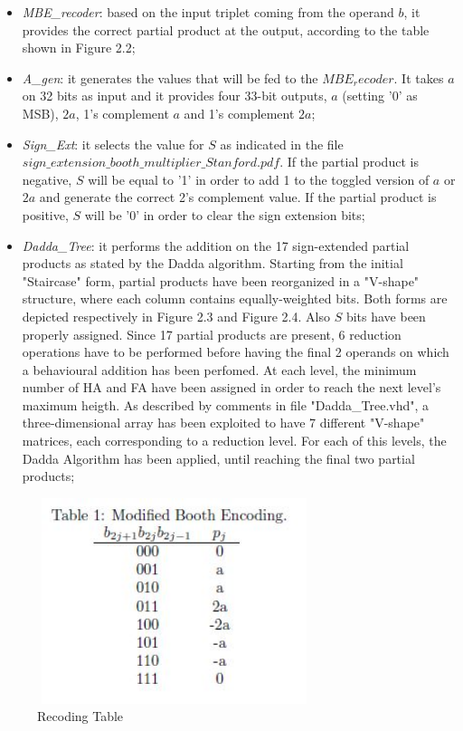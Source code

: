 \begin{itemize}
 
\item \emph{MBE\_recoder}: based on the input triplet coming from the operand $b$, it provides the correct partial product 
at the output, according to the table shown in Figure 2.2;

\item \emph{A\_gen}: it generates the values that will be fed to the $MBE_recoder$. It takes
$a$ on 32 bits as input and it provides four 33-bit outputs, $a$ (setting '0' as MSB), $2a$,
1's complement $a$ and 1's complement $2a$;

\item \emph{Sign\_Ext}: it selects the value for $S$ as indicated in the file
$sign\_extension\_booth\_multiplier\_Stanford.pdf$. If the partial product is negative, $S$ will be 
equal to '1' in order to add 1 to the toggled version of $a$ or $2a$ and generate the correct
2's complement value. If the partial product is positive, $S$ will be '0' in order to clear
the sign extension bits;

\item \emph{Dadda\_Tree}: it performs the addition on the 17 sign-extended partial products as
stated by the Dadda algorithm. Starting from the initial "Staircase" form, partial products have been reorganized in a "V-shape" structure, where each column contains equally-weighted bits. Both forms are depicted respectively in Figure 2.3 and Figure 2.4. Also $S$
bits have been properly assigned. Since 17 partial products are present, 6 reduction operations have to be performed before having the final 2 operands on which a behavioural
addition has been perfomed. At each level, the minimum number of HA and FA have been assigned
in order to reach the next level's maximum heigth. As described by comments in file "Dadda\_Tree.vhd", a three-dimensional array has been exploited to have 7 different "V-shape" matrices, each corresponding to a reduction level. For each of this levels, the Dadda Algorithm has been applied, until reaching the final two partial products;

\end{itemize}


\begin{figure}[H]
	\centering
	\includegraphics[width=8cm, height=6cm]{img/MBE.jpeg} 
	\caption{Recoding Table}
	\label{Recoding Table} 
\end{figure}

